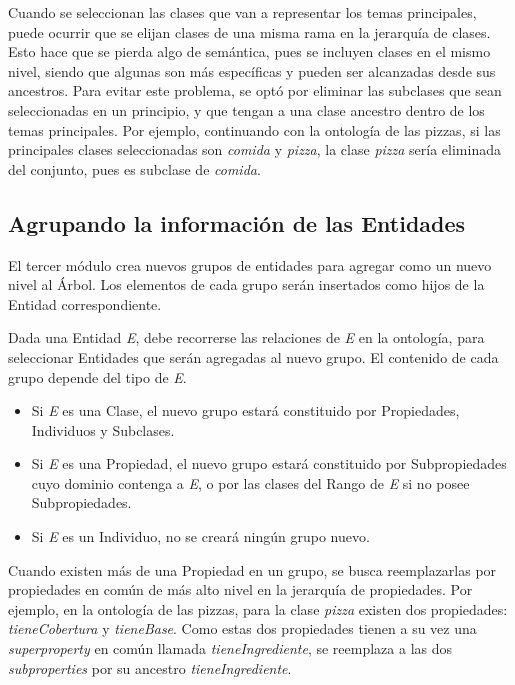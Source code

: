 Cuando se seleccionan las clases que van a representar los temas principales, puede ocurrir que se elijan clases de una misma rama en la jerarquía de clases. Esto hace que se pierda algo de semántica, pues se incluyen clases en el mismo nivel, siendo que algunas son más específicas y pueden ser alcanzadas desde sus ancestros. Para evitar este problema, se optó por eliminar las subclases que sean seleccionadas en un principio, y que tengan a una clase ancestro dentro de los temas principales. Por ejemplo, continuando con la ontología de las pizzas, si las principales clases seleccionadas son \emph{comida} y \emph{pizza}, la clase \emph{pizza} sería eliminada del conjunto, pues es subclase de \emph{comida}. 

\subsection{Agrupando la información de las Entidades}
\label{sec:agrupando_info}
El tercer módulo crea nuevos grupos de entidades para agregar como un nuevo nivel al Árbol. Los elementos de cada grupo serán insertados como hijos de la Entidad correspondiente.

Dada una Entidad \emph{E}, debe recorrerse las relaciones de \emph{E} en la ontología, para seleccionar Entidades que serán agregadas al nuevo grupo.
El contenido de cada grupo depende del tipo de \emph{E}.
\begin{itemize}
    \item Si \emph{E} es una Clase, el nuevo grupo estará constituido por Propiedades, Individuos y Subclases. 
    \item Si \emph{E} es una Propiedad, el nuevo grupo estará constituido por Subpropiedades cuyo dominio contenga a \emph{E}, o por las clases del Rango de \emph{E} si no posee Subpropiedades.
    \item Si \emph{E} es un Individuo, no se creará ningún grupo nuevo.
\end{itemize}

Cuando existen más de una Propiedad en un grupo, se busca reemplazarlas por propiedades en común de más alto nivel en la jerarquía de propiedades. Por ejemplo, en la ontología de las pizzas, para la clase \emph{pizza} existen dos propiedades: \emph{tieneCobertura} y \emph{tieneBase}. Como estas dos propiedades tienen a su vez una \emph{superproperty} en común llamada \emph{tieneIngrediente}, se reemplaza a las dos \emph{subproperties} por su ancestro \emph{tieneIngrediente}.


